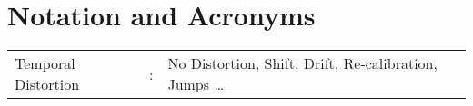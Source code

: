 \chapter*{Notation and Acronyms}
%

\begin{tabular}{lcl}
    Temporal Distortion &:     & No Distortion, Shift, Drift, Re-calibration, Jumps \ldots            \\
\end{tabular}
